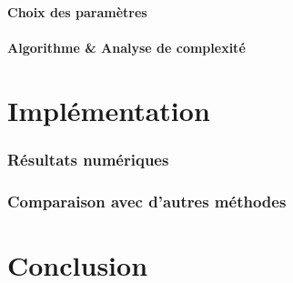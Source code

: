 \documentclass[a4paper]{article} %
\numberwithin{section}{part}
\numberwithin{equation}{section}
\begin{document}
\subsection{Choix des paramètres}

\subsection{Algorithme \& Analyse de complexité}

\part{Implémentation}
\section{Résultats numériques}

\section{Comparaison avec d'autres méthodes}

\part{Conclusion}
\end{document}
